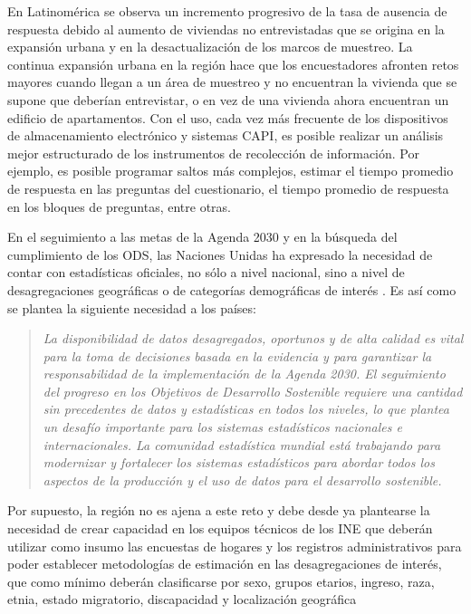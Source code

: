 En Latinomérica se observa un incremento progresivo de la tasa de ausencia de respuesta debido al aumento de viviendas no entrevistadas que se origina en la expansión urbana y en la desactualización de los marcos de muestreo. La continua expansión urbana en la región hace que los encuestadores afronten retos mayores cuando llegan a un área de muestreo y no encuentran la vivienda que se supone que deberían entrevistar, o en vez de una vivienda ahora encuentran un edificio de apartamentos. Con el uso, cada vez más frecuente de los dispositivos de almacenamiento electrónico y sistemas CAPI, es posible realizar un análisis mejor estructurado de los instrumentos de recolección de información. Por ejemplo, es posible programar saltos más complejos, estimar el tiempo promedio de respuesta en las preguntas del cuestionario, el tiempo promedio de respuesta en los bloques de preguntas, entre otras.

En el seguimiento a las metas de la Agenda 2030 y en la búsqueda del cumplimiento de los ODS, las Naciones Unidas ha expresado la necesidad de contar con estadísticas oficiales, no sólo a nivel nacional, sino a nivel de desagregaciones geográficas o de categorías demográficas de interés \citep{United_Nations_2017}. Es así como se plantea la siguiente necesidad a los países:

\begin{quote}
\emph{La disponibilidad de datos desagregados, oportunos y de alta calidad es vital para la toma de decisiones basada en la evidencia y para garantizar la responsabilidad de la implementación de la Agenda 2030. El seguimiento del progreso en los Objetivos de Desarrollo Sostenible requiere una cantidad sin precedentes de datos y estadísticas en todos los niveles, lo que plantea un desafío importante para los sistemas estadísticos nacionales e internacionales. La comunidad estadística mundial está trabajando para modernizar y fortalecer los sistemas estadísticos para abordar todos los aspectos de la producción y el uso de datos para el desarrollo sostenible.}
\end{quote}

Por supuesto, la región no es ajena a este reto y debe desde ya plantearse la necesidad de crear capacidad en los equipos técnicos de los INE que deberán utilizar como insumo las encuestas de hogares y los registros administrativos para poder establecer metodologías de estimación en las desagregaciones de interés, que como mínimo deberán clasificarse por sexo, grupos etarios, ingreso, raza, etnia, estado migratorio, discapacidad y localización geográfica \citep{United_Nations_2016}

